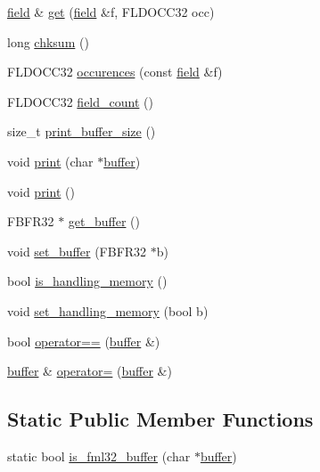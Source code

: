 \begin{DoxyCompactItemize}
\item 
\hyperlink{classatmi_1_1field}{field} \& \hyperlink{classatmi_1_1buffer_a864adb4d0153e6be38a7905c994915e1}{get} (\hyperlink{classatmi_1_1field}{field} \&f, F\+L\+D\+O\+C\+C32 occ)
\item 
long \hyperlink{classatmi_1_1buffer_a4ae9fa419098eb136ae3681ad90ccafb}{chksum} ()
\item 
F\+L\+D\+O\+C\+C32 \hyperlink{classatmi_1_1buffer_a57ff1b2ed449d59d4ec936e9e79a5d1a}{occurences} (const \hyperlink{classatmi_1_1field}{field} \&f)
\item 
F\+L\+D\+O\+C\+C32 \hyperlink{classatmi_1_1buffer_a606dc00b174c6c583e46e7ee954efb7a}{field\+\_\+count} ()
\item 
size\+\_\+t \hyperlink{classatmi_1_1buffer_adac6bef9345e71f5d15c6b8db1bf9468}{print\+\_\+buffer\+\_\+size} ()
\item 
void \hyperlink{classatmi_1_1buffer_a449fb438f3daa29b18ac302a3c2fefc4}{print} (char $\ast$\hyperlink{classatmi_1_1buffer}{buffer})
\item 
void \hyperlink{classatmi_1_1buffer_a04d31b2fb8d27274ad81e8064eec3765}{print} ()
\item 
F\+B\+F\+R32 $\ast$ \hyperlink{classatmi_1_1buffer_aa9aa5382717ed17a2047db2779f8f0ec}{get\+\_\+buffer} ()
\item 
void \hyperlink{classatmi_1_1buffer_ade8853e7c2ae10dcd024b34049e99af3}{set\+\_\+buffer} (F\+B\+F\+R32 $\ast$b)
\item 
bool \hyperlink{classatmi_1_1buffer_aae543cf7816b338d20031993c18ce491}{is\+\_\+handling\+\_\+memory} ()
\item 
void \hyperlink{classatmi_1_1buffer_a68f05d1dbd040062850feeba5aa188fc}{set\+\_\+handling\+\_\+memory} (bool b)
\item 
bool \hyperlink{classatmi_1_1buffer_a580571a4a3cf75eafe90543e9ab07333}{operator==} (\hyperlink{classatmi_1_1buffer}{buffer} \&)
\item 
\hyperlink{classatmi_1_1buffer}{buffer} \& \hyperlink{classatmi_1_1buffer_a5cb08586cc2e633a3b0e80755dda53cd}{operator=} (\hyperlink{classatmi_1_1buffer}{buffer} \&)
\end{DoxyCompactItemize}
\subsection*{Static Public Member Functions}
\begin{DoxyCompactItemize}
\item 
static bool \hyperlink{classatmi_1_1buffer_a38aca9956db23474cb19d4c737b08262}{is\+\_\+fml32\+\_\+buffer} (char $\ast$\hyperlink{classatmi_1_1buffer}{buffer})
\end{DoxyCompactItemize}
